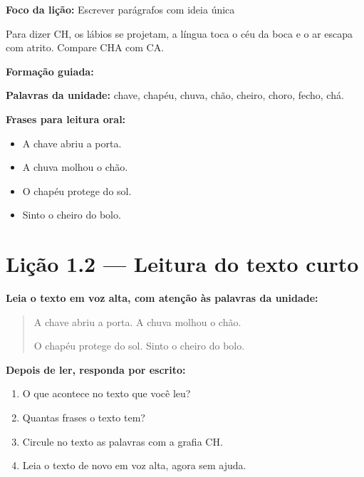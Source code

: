 \textbf{Foco da lição:} Escrever parágrafos com ideia única


\begin{boquinha}
Para dizer CH, os lábios se projetam, a língua toca o céu da boca e o ar escapa com atrito. Compare CHA com CA.
\end{boquinha}

\noindent\textbf{Formação guiada:}

\begin{center}
\end{center}

\noindent\textbf{Palavras da unidade:} chave, chapéu, chuva, chão, cheiro, choro, fecho, chá.

\noindent\textbf{Frases para leitura oral:}
\begin{itemize}[leftmargin=1.6em]
  \item A chave abriu a porta.
  \item A chuva molhou o chão.
  \item O chapéu protege do sol.
  \item Sinto o cheiro do bolo.
\end{itemize}

\section{Lição 1.2 --- Leitura do texto curto}

\noindent\textbf{Leia o texto em voz alta, com atenção às palavras da unidade:}


\begin{quote}
A chave abriu a porta. A chuva molhou o chão.

O chapéu protege do sol. Sinto o cheiro do bolo.
\end{quote}

\textbf{Depois de ler, responda por escrito:}
\begin{enumerate}

  \item O que acontece no texto que você leu?
  \begin{center}
  \underline{\hspace{12cm}}
  \end{center}

  \item Quantas frases o texto tem?
  \begin{center}
  \underline{\hspace{12cm}}
  \end{center}

  \item Circule no texto as palavras com a grafia CH.

  \item Leia o texto de novo em voz alta, agora sem ajuda.

\end{enumerate}


